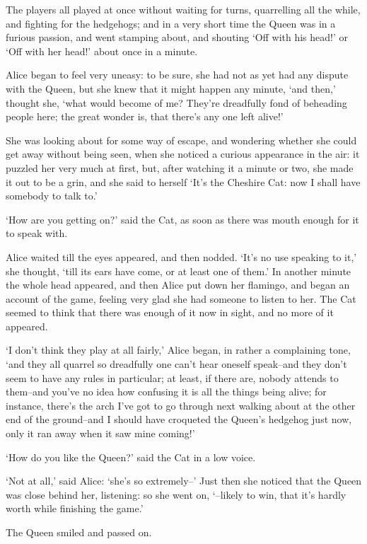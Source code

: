 \documentclass[12pt]{book}
\begin{document}
  The players all played at once without waiting for turns,
quarrelling all the while, and fighting for the hedgehogs; and in
a very short time the Queen was in a furious passion, and went
stamping about, and shouting `Off with his head!' or `Off with
her head!' about once in a minute.

  Alice began to feel very uneasy:  to be sure, she had not as
yet had any dispute with the Queen, but she knew that it might
happen any minute, `and then,' thought she, `what would become of
me?  They're dreadfully fond of beheading people here; the great
wonder is, that there's any one left alive!'

  She was looking about for some way of escape, and wondering
whether she could get away without being seen, when she noticed a
curious appearance in the air:  it puzzled her very much at
first, but, after watching it a minute or two, she made it out to
be a grin, and she said to herself `It's the Cheshire Cat:  now I
shall have somebody to talk to.'

  `How are you getting on?' said the Cat, as soon as there was
mouth enough for it to speak with.

  Alice waited till the eyes appeared, and then nodded.  `It's no
use speaking to it,' she thought, `till its ears have come, or at
least one of them.'  In another minute the whole head appeared,
and then Alice put down her flamingo, and began an account of the
game, feeling very glad she had someone to listen to her.  The
Cat seemed to think that there was enough of it now in sight, and
no more of it appeared.

  `I don't think they play at all fairly,' Alice began, in rather
a complaining tone, `and they all quarrel so dreadfully one can't
hear oneself speak--and they don't seem to have any rules in
particular; at least, if there are, nobody attends to them--and
you've no idea how confusing it is all the things being alive;
for instance, there's the arch I've got to go through next
walking about at the other end of the ground--and I should have
croqueted the Queen's hedgehog just now, only it ran away when it
saw mine coming!'

  `How do you like the Queen?' said the Cat in a low voice.

  `Not at all,' said Alice:  `she's so extremely--'  Just then
she noticed that the Queen was close behind her, listening:  so
she went on, `--likely to win, that it's hardly worth while
finishing the game.'

  The Queen smiled and passed on.
\end{document}
